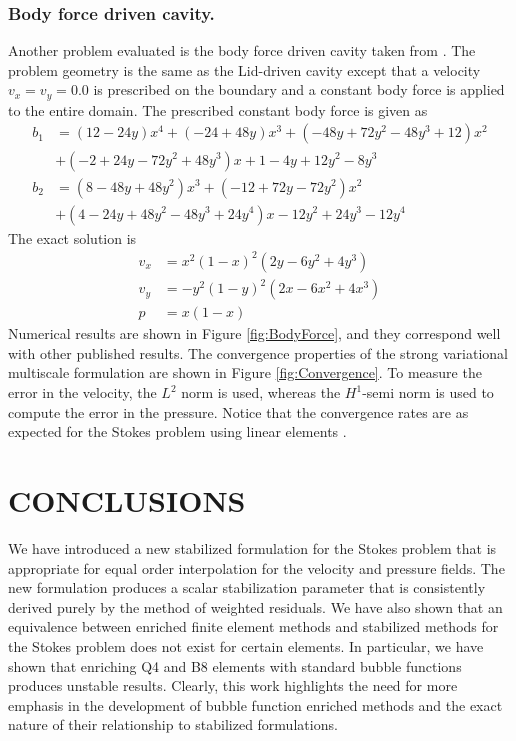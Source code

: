 \documentclass[11pt]{amsart}
\begin{document}
\subsubsection{Body force driven cavity.}
Another problem evaluated is the body force driven cavity taken from \cite{Donea}.  The problem geometry is the same as the Lid-driven cavity except that a velocity $v_x = v_y = 0.0$ is prescribed on the boundary and a constant body force is applied to the entire domain.  The prescribed constant body force is given as
\begin{align}
b_1 &= (12-24y)x^4 + (-24+48y)x^3 + (-48y+72y^2-48y^3+12)x^2 \nonumber \\
&+(-2+24y-72y^2+48y^3)x +1 - 4y +12y^2-8y^3 \nonumber \\
b_2 &= (8-48y+48y^2)x^3 + (-12+72y-72y^2)x^2 \nonumber \\ 
&+(4-24y+48y^2-48y^3+24y^4)x - 12y^2+24y^3-12y^4
\end{align}
The exact solution is
\begin{align}
v_x & = x^2(1-x)^2(2y-6y^2+4y^3) \nonumber \\
v_y & = -y^2(1-y)^2(2x-6x^2+4x^3) \nonumber \\
p & = x(1-x)
\end{align}
Numerical results are shown in Figure \ref{fig:BodyForce}, and they correspond well with other published results.  The convergence properties of the strong variational multiscale formulation are shown in Figure \ref{fig:Convergence}.  To measure the error in the velocity, the $L^2$ norm is used, whereas the $H^1$-semi norm is used to compute the error in the pressure.  Notice that the convergence rates are as expected for the Stokes problem using linear elements \cite{PSPG}.


% 

\section{CONCLUSIONS}
We have introduced a new stabilized formulation for the Stokes problem that is appropriate for equal order interpolation for the velocity and pressure fields.  The new formulation produces a scalar stabilization parameter that is consistently derived purely by the method of weighted residuals. We have also shown that an equivalence between enriched finite element methods and stabilized methods for the Stokes problem does not exist for certain elements.  In particular, we have shown that enriching Q4 and B8 elements with standard bubble functions produces unstable results.  Clearly, this work highlights the need for more emphasis in the development of bubble function enriched methods and the exact nature of their relationship to stabilized formulations.
\end{document}

